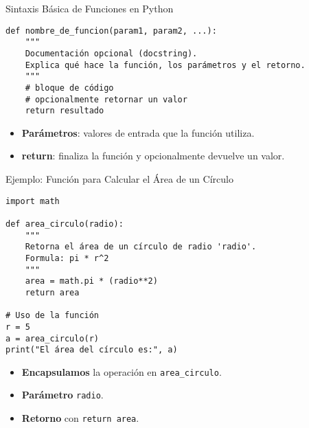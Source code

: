 \documentclass[10pt]{beamer}
\begin{document}
\begin{frame}[fragile]{Sintaxis Básica de Funciones en Python}
\begin{verbatim}
def nombre_de_funcion(param1, param2, ...):
    """
    Documentación opcional (docstring).
    Explica qué hace la función, los parámetros y el retorno.
    """
    # bloque de código
    # opcionalmente retornar un valor
    return resultado
\end{verbatim}
\begin{itemize}
  \item \textbf{Parámetros}: valores de entrada que la función utiliza.
  \item \textbf{return}: finaliza la función y opcionalmente devuelve un valor.
\end{itemize}
\end{frame}

\begin{frame}[fragile]{Ejemplo: Función para Calcular el Área de un Círculo}
\begin{verbatim}
import math

def area_circulo(radio):
    """
    Retorna el área de un círculo de radio 'radio'.
    Formula: pi * r^2
    """
    area = math.pi * (radio**2)
    return area

# Uso de la función
r = 5
a = area_circulo(r)
print("El área del círculo es:", a)
\end{verbatim}
\begin{itemize}
  \item \textbf{Encapsulamos} la operación en \texttt{area\_circulo}.
  \item \textbf{Parámetro} \texttt{radio}.
  \item \textbf{Retorno} con \texttt{return area}.
\end{itemize}
\end{frame}

\end{document}
